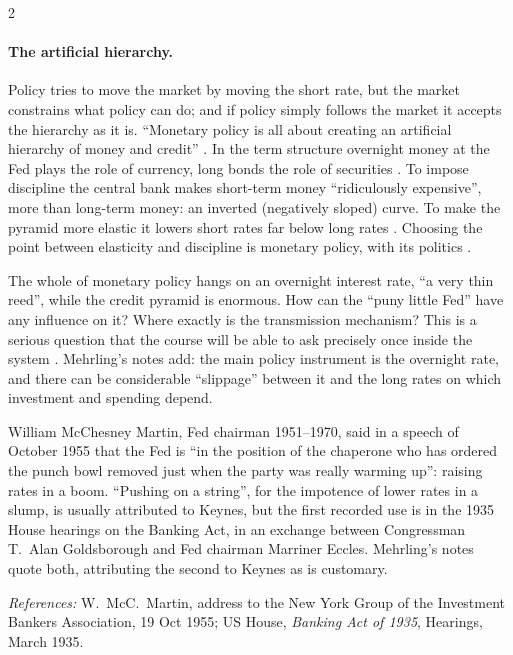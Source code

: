 \begin{paracol}{2}
\paragraph{The artificial hierarchy.} Policy tries to move the market by moving the short rate, but the market constrains
what policy can do; and if policy simply follows the market it accepts the hierarchy as it is. ``Monetary policy is all
about creating an artificial hierarchy of money and credit'' . In the term structure overnight money at the
Fed plays the role of currency, long bonds the role of securities . To impose discipline the
central bank makes short-term money ``ridiculously expensive'', more than long-term money: an inverted (negatively sloped)
curve. To make the pyramid more elastic it lowers short rates far below long rates . Choosing
the point between elasticity and discipline is monetary policy, with its politics .

\begin{intuition}
The whole of monetary policy hangs on an overnight interest rate, ``a very thin reed'', while the credit pyramid is
enormous. How can the ``puny little Fed'' have any influence on it? Where exactly is the transmission mechanism? This is a
serious question that the course will be able to ask precisely once inside the system .
Mehrling's notes  add: the main policy instrument is the overnight rate, and there can be considerable ``slippage''
between it and the long rates on which investment and spending depend.
\end{intuition}\begin{history}
William McChesney Martin, Fed chairman 1951--1970, said in a speech of October 1955 that the Fed is ``in the position of
the chaperone who has ordered the punch bowl removed just when the party was really warming up'': raising rates in a boom.
``Pushing on a string'', for the impotence of lower rates in a slump, is usually attributed to Keynes, but the first
recorded use is in the 1935 House hearings on the Banking Act, in an exchange between Congressman T.~Alan Goldsborough and
Fed chairman Marriner Eccles. Mehrling's notes  quote both, attributing the second to Keynes as is customary.\par
\emph{References:} W.~McC.~Martin, address to the New York Group of the Investment Bankers Association, 19 Oct 1955;
US House, \emph{Banking Act of 1935}, Hearings, March 1935.
\end{history}


\end{paracol}

